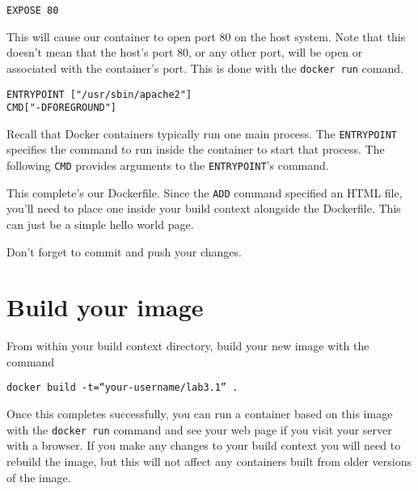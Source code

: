 \documentclass{article}
\begin{document}
\texttt{EXPOSE 80}

This will cause our container to open port 80 on the host system.  Note that this doesn't mean that the host's port 80, or any other port, will be open or associated with the container's port.  This is done with the \texttt{docker run} comand.

\begin{verbatim}
ENTRYPOINT ["/usr/sbin/apache2"]
CMD["-DFOREGROUND"]
\end{verbatim}

Recall that Docker containers typically run one main process.  The \texttt{ENTRYPOINT} specifies the command to run inside the container to start that process. The following \texttt{CMD} provides arguments to the \texttt{ENTRYPOINT}'s command.

This complete's our Dockerfile.  Since the \texttt{ADD} command specified an HTML file, you'll need to place one inside your build context alongside the Dockerfile. This can just be a simple hello world page.

Don't forget to commit and push your changes.

\section{Build your image}
From within your build context directory, build your new image with the command

\texttt{docker build -t=``your-username/lab3.1'' .}

Once this completes successfully, you can run a container based on this image with the \texttt{docker run} command and see your web page if you visit your server with a browser. If you make any changes  to your build context you will need to rebuild the image, but this will not affect any containers built from older versions of the image.
\end{document}
